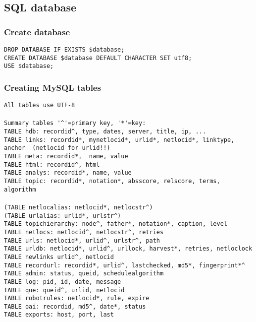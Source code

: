 \subsection{SQL database}
\label{sqlstruct}
\subsubsection{Create database}
\verb+DROP DATABASE IF EXISTS $database;+\\
\verb+CREATE DATABASE $database DEFAULT CHARACTER SET utf8;+\\
\verb+USE $database;+\\
\subsubsection{Creating MySQL tables}
\verb+All tables use UTF-8+\\
\verb++\\
\verb+Summary tables '^'=primary key, '*'=key:+\\
\verb+TABLE hdb: recordid^, type, dates, server, title, ip, ...+\\
\verb+TABLE links: recordid*, mynetlocid*, urlid*, netlocid*, linktype, anchor  (netlocid for urlid!!)+\\
\verb+TABLE meta: recordid*,  name, value+\\
\verb+TABLE html: recordid^, html+\\
\verb+TABLE analys: recordid*, name, value+\\
\verb+TABLE topic: recordid*, notation*, absscore, relscore, terms, algorithm+\\
\verb++\\
\verb+(TABLE netlocalias: netlocid*, netlocstr^)+\\
\verb+(TABLE urlalias: urlid*, urlstr^)+\\
\verb+TABLE topichierarchy: node^, father*, notation*, caption, level+\\
\verb+TABLE netlocs: netlocid^, netlocstr^, retries+\\
\verb+TABLE urls: netlocid*, urlid^, urlstr^, path+\\
\verb+TABLE urldb: netlocid*, urlid^, urllock, harvest*, retries, netloclock+\\
\verb+TABLE newlinks urlid^, netlocid+\\
\verb+TABLE recordurl: recordid*, urlid^, lastchecked, md5*, fingerprint*^+\\
\verb+TABLE admin: status, queid, schedulealgorithm+\\
\verb+TABLE log: pid, id, date, message+\\
\verb+TABLE que: queid^, urlid, netlocid+\\
\verb+TABLE robotrules: netlocid*, rule, expire+\\
\verb+TABLE oai: recordid, md5^, date*, status+\\
\verb+TABLE exports: host, port, last+\\
